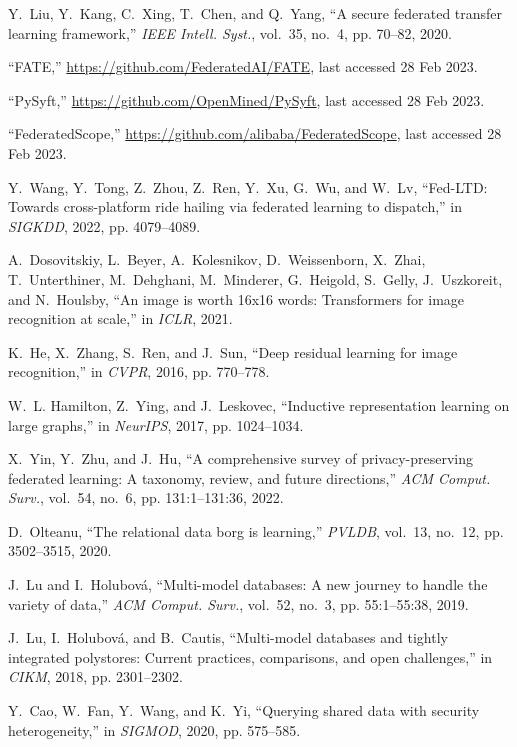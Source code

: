 \documentclass[11pt]{article}
\begin{document}
\begin{thebibliography}{10}
Y.~Liu, Y.~Kang, C.~Xing, T.~Chen, and Q.~Yang, ``A secure federated transfer
  learning framework,'' \emph{{IEEE} Intell. Syst.}, vol.~35, no.~4, pp.
  70--82, 2020.

``{FATE},'' \url{https://github.com/FederatedAI/FATE}, last accessed 28 Feb
  2023.

``{PySyft},'' \url{https://github.com/OpenMined/PySyft}, last accessed 28 Feb
  2023.

``{FederatedScope},'' \url{https://github.com/alibaba/FederatedScope}, last
  accessed 28 Feb 2023.

Y.~Wang, Y.~Tong, Z.~Zhou, Z.~Ren, Y.~Xu, G.~Wu, and W.~Lv, ``{Fed-LTD}:
  Towards cross-platform ride hailing via federated learning to dispatch,'' in
  \emph{{SIGKDD}}, 2022, pp. 4079--4089.

A.~Dosovitskiy, L.~Beyer, A.~Kolesnikov, D.~Weissenborn, X.~Zhai,
  T.~Unterthiner, M.~Dehghani, M.~Minderer, G.~Heigold, S.~Gelly, J.~Uszkoreit,
  and N.~Houlsby, ``An image is worth 16x16 words: Transformers for image
  recognition at scale,'' in \emph{{ICLR}}, 2021.

K.~He, X.~Zhang, S.~Ren, and J.~Sun, ``Deep residual learning for image
  recognition,'' in \emph{{CVPR}}, 2016, pp. 770--778.

W.~L. Hamilton, Z.~Ying, and J.~Leskovec, ``Inductive representation learning
  on large graphs,'' in \emph{{NeurIPS}}, 2017, pp. 1024--1034.

X.~Yin, Y.~Zhu, and J.~Hu, ``A comprehensive survey of privacy-preserving
  federated learning: {A} taxonomy, review, and future directions,''
  \emph{{ACM} Comput. Surv.}, vol.~54, no.~6, pp. 131:1--131:36, 2022.

D.~Olteanu, ``The relational data borg is learning,'' \emph{{PVLDB}}, vol.~13,
  no.~12, pp. 3502--3515, 2020.

J.~Lu and I.~Holubov{\'{a}}, ``Multi-model databases: {A} new journey to handle
  the variety of data,'' \emph{{ACM} Comput. Surv.}, vol.~52, no.~3, pp.
  55:1--55:38, 2019.

J.~Lu, I.~Holubov{\'{a}}, and B.~Cautis, ``Multi-model databases and tightly
  integrated polystores: Current practices, comparisons, and open challenges,''
  in \emph{{CIKM}}, 2018, pp. 2301--2302.

Y.~Cao, W.~Fan, Y.~Wang, and K.~Yi, ``Querying shared data with security
  heterogeneity,'' in \emph{{SIGMOD}}, 2020, pp. 575--585.

\end{thebibliography}
\end{document}
